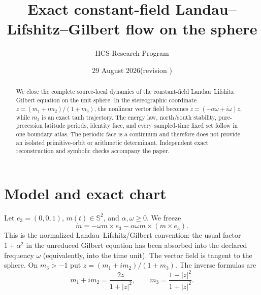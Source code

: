 \documentclass[10pt]{article}
\title{Exact constant-field Landau--Lifshitz--Gilbert flow on the sphere}
\author{HCS Research Program}
\date{29 August 2026\quad (revision \CRevisionRound)}
\newcommand{\Sph}{\mathbb S^2}
\begin{document}
\maketitle

\begin{abstract}
We close the complete source-local dynamics of the constant-field
Landau--Lifshitz--Gilbert equation on the unit sphere.  In the stereographic
coordinate \(z=(m_1+i m_2)/(1+m_3)\), the nonlinear vector field becomes
\(\dot z=(-\alpha\omega+i\omega)z\), while \(m_3\) is an exact tanh
trajectory.  The energy law, north/south stability, pure-precession latitude
periods, identity face, and every sampled-time fixed set follow in one
boundary atlas.  The periodic face is a continuum and therefore does not
provide an isolated primitive-orbit or arithmetic determinant.  Independent
exact reconstruction and symbolic checks accompany the paper.
\end{abstract}

\section{Model and exact chart}
Let \(e_3=(0,0,1)\), \(m(t)\in\Sph\), and \(\alpha,\omega\geq0\).  We freeze
\begin{equation}
 \dot m=-\omega m\times e_3-\alpha\omega m\times(m\times e_3).
 \tag{1}
\end{equation}
This is the normalized Landau--Lifshitz/Gilbert convention: the usual
factor \(1+\alpha^2\) in the unreduced Gilbert equation has been absorbed
into the declared frequency \(\omega\) (equivalently, into the time unit).
The vector field is tangent to the sphere.  On \(m_3>-1\) put
\(z=(m_1+i m_2)/(1+m_3)\).  The inverse formulas are
\begin{equation}
 m_1+i m_2=\frac{2z}{1+|z|^2},\qquad
 m_3=\frac{1-|z|^2}{1+|z|^2}.
 \tag{2}
\end{equation}
\end{document}

